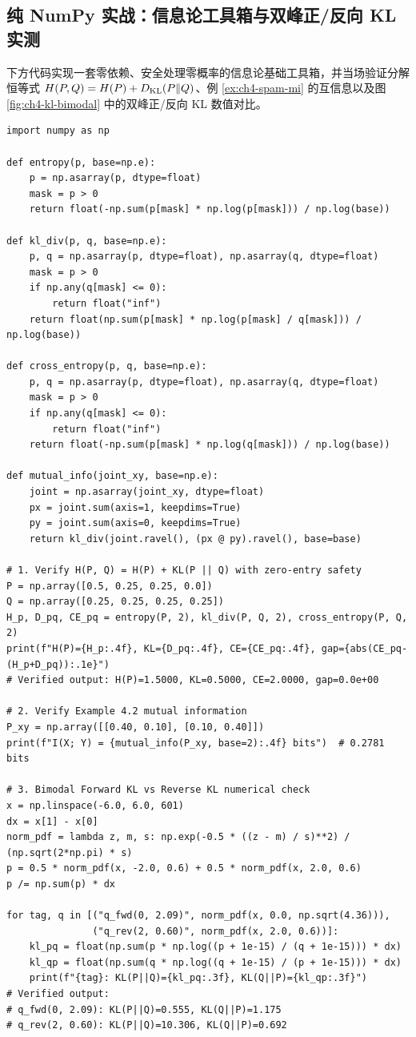 \subsection{纯 NumPy 实战：信息论工具箱与双峰正/反向 KL 实测}

下方代码实现一套零依赖、安全处理零概率的信息论基础工具箱，并当场验证分解恒等式 $H(P,Q) = H(P) + D_{\mathrm{KL}}(P\|Q)$、例 \ref{ex:ch4-spam-mi} 的互信息以及图 \ref{fig:ch4-kl-bimodal} 中的双峰正/反向 KL 数值对比。

\begin{lstlisting}[caption={安全版信息论工具箱与双峰正/反向 KL 实测（纯 NumPy）},label={lst:ch4-info-tools}]
import numpy as np

def entropy(p, base=np.e):
    p = np.asarray(p, dtype=float)
    mask = p > 0
    return float(-np.sum(p[mask] * np.log(p[mask])) / np.log(base))

def kl_div(p, q, base=np.e):
    p, q = np.asarray(p, dtype=float), np.asarray(q, dtype=float)
    mask = p > 0
    if np.any(q[mask] <= 0):
        return float("inf")
    return float(np.sum(p[mask] * np.log(p[mask] / q[mask])) / np.log(base))

def cross_entropy(p, q, base=np.e):
    p, q = np.asarray(p, dtype=float), np.asarray(q, dtype=float)
    mask = p > 0
    if np.any(q[mask] <= 0):
        return float("inf")
    return float(-np.sum(p[mask] * np.log(q[mask])) / np.log(base))

def mutual_info(joint_xy, base=np.e):
    joint = np.asarray(joint_xy, dtype=float)
    px = joint.sum(axis=1, keepdims=True)
    py = joint.sum(axis=0, keepdims=True)
    return kl_div(joint.ravel(), (px @ py).ravel(), base=base)

# 1. Verify H(P, Q) = H(P) + KL(P || Q) with zero-entry safety
P = np.array([0.5, 0.25, 0.25, 0.0])
Q = np.array([0.25, 0.25, 0.25, 0.25])
H_p, D_pq, CE_pq = entropy(P, 2), kl_div(P, Q, 2), cross_entropy(P, Q, 2)
print(f"H(P)={H_p:.4f}, KL={D_pq:.4f}, CE={CE_pq:.4f}, gap={abs(CE_pq-(H_p+D_pq)):.1e}")
# Verified output: H(P)=1.5000, KL=0.5000, CE=2.0000, gap=0.0e+00

# 2. Verify Example 4.2 mutual information
P_xy = np.array([[0.40, 0.10], [0.10, 0.40]])
print(f"I(X; Y) = {mutual_info(P_xy, base=2):.4f} bits")  # 0.2781 bits

# 3. Bimodal Forward KL vs Reverse KL numerical check
x = np.linspace(-6.0, 6.0, 601)
dx = x[1] - x[0]
norm_pdf = lambda z, m, s: np.exp(-0.5 * ((z - m) / s)**2) / (np.sqrt(2*np.pi) * s)
p = 0.5 * norm_pdf(x, -2.0, 0.6) + 0.5 * norm_pdf(x, 2.0, 0.6)
p /= np.sum(p) * dx

for tag, q in [("q_fwd(0, 2.09)", norm_pdf(x, 0.0, np.sqrt(4.36))),
               ("q_rev(2, 0.60)", norm_pdf(x, 2.0, 0.6))]:
    kl_pq = float(np.sum(p * np.log((p + 1e-15) / (q + 1e-15))) * dx)
    kl_qp = float(np.sum(q * np.log((q + 1e-15) / (p + 1e-15))) * dx)
    print(f"{tag}: KL(P||Q)={kl_pq:.3f}, KL(Q||P)={kl_qp:.3f}")
# Verified output:
# q_fwd(0, 2.09): KL(P||Q)=0.555, KL(Q||P)=1.175
# q_rev(2, 0.60): KL(P||Q)=10.306, KL(Q||P)=0.692
\end{lstlisting}

